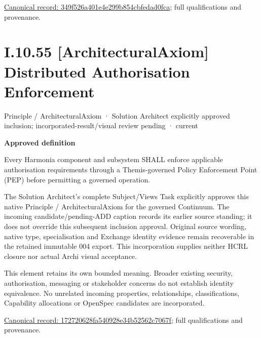 {\footnotesize \href{../../../../continuum/motivation/principle/architectural-axiom/349f526a401e4e299b854cbfedad0fca.md}{Canonical record: 349f526a401e4e299b854cbfedad0fca}; full qualifications and provenance.}\par
\section*{I.10.55 [ArchitecturalAxiom] Distributed Authorisation Enforcement}
\label{navigation:I.10.55}

\label{element:172720628fa540928e34b52562c7067f}
{\small Principle / ArchitecturalAxiom · Solution Architect explicitly approved inclusion; incorporated-result/visual review pending · current}\par

\par\medskip\textbf{Approved definition}\par


Every Harmonia component and subsystem SHALL enforce applicable authorisation requirements through a Themis-governed Policy Enforcement Point (PEP) before permitting a governed operation.



The Solution Architect's complete Subject/Views Task explicitly approves this
native Principle / ArchitecturalAxiom for the governed Continuum.
The incoming candidate/pending-ADD caption records its earlier source standing;
it does not override this subsequent inclusion approval. Original source wording,
native type, specialisation and Exchange identity evidence remain recoverable in
the retained immutable 004 export. This incorporation supplies neither HCRL closure
nor actual Archi visual acceptance.



This element retains its own bounded meaning. Broader existing security,
authorisation, messaging or stakeholder concerns do not establish identity
equivalence. No unrelated incoming properties, relationships, classifications,
Capability allocations or OpenSpec candidates are incorporated.


{\footnotesize \href{../../../../continuum/motivation/principle/architectural-axiom/172720628fa540928e34b52562c7067f.md}{Canonical record: 172720628fa540928e34b52562c7067f}; full qualifications and provenance.}\par
